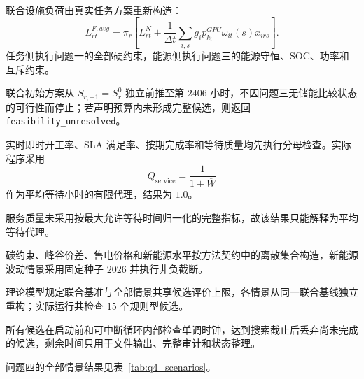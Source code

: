 联合设施负荷由真实任务方案重新构造：
\begin{equation}
L_{rt}^{F,avg}=\pi_r\left[
L_{rt}^{N}+\frac{1}{\Delta t}
\sum_{i,s}g_ip_{k_i}^{GPU}\omega_{it}(s)x_{irs}
\right].
\end{equation}
任务侧执行问题一的全部硬约束，能源侧执行问题三的能源守恒、SOC、功率和互斥约束。

联合初始方案从 $S_{r,-1}=S_r^0$ 独立前推至第 $2406$ 小时，不因问题三无储能比较状态的可行性而停止；若声明预算内未形成完整候选，则返回 \texttt{feasibility\_unresolved}。

实时即时开工率、SLA 满足率、按期完成率和等待质量均先执行分母检查。实际程序采用
\begin{equation}
Q_{\mathrm{service}}=\frac{1}{1+\overline W}
\end{equation}
作为平均等待小时的有限代理，结果为 $1.0$。

服务质量未采用按最大允许等待时间归一化的完整指标，故该结果只能解释为平均等待代理。

碳约束、峰谷价差、售电价格和新能源水平按方法契约中的离散集合构造，新能源波动情景采用固定种子 $2026$ 并执行非负截断。

理论模型规定联合基准与全部情景共享候选评价上限，各情景从同一联合基线独立重构；实际运行共检查 $15$ 个规则型候选。

所有候选在启动前和可中断循环内部检查单调时钟，达到搜索截止后丢弃尚未完成的候选，剩余时间只用于文件输出、完整审计和状态整理。

问题四的全部情景结果见表~\ref{tab:q4_scenarios}。

